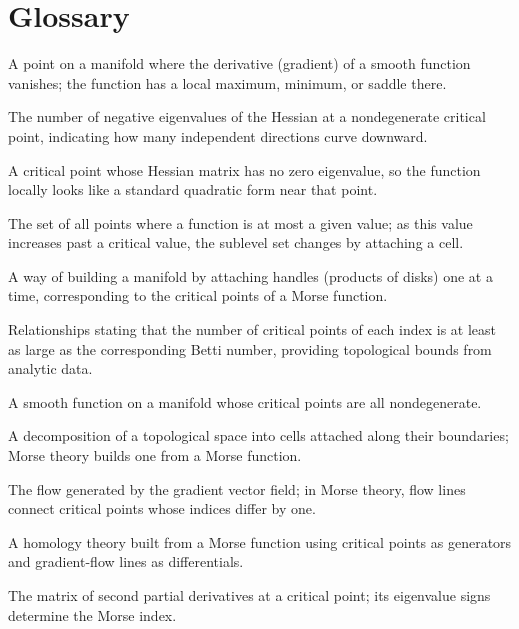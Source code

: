 \section*{Glossary}
\begin{description}[leftmargin=*,style=nextline,itemsep=0.3em]
\item[\textbf{Critical point.}] A point on a manifold where the derivative (gradient) of a smooth function vanishes; the function has a local maximum, minimum, or saddle there.
\item[\textbf{Morse index.}] The number of negative eigenvalues of the Hessian at a nondegenerate critical point, indicating how many independent directions curve downward.
\item[\textbf{Nondegenerate critical point.}] A critical point whose Hessian matrix has no zero eigenvalue, so the function locally looks like a standard quadratic form near that point.
\item[\textbf{Sublevel set.}] The set of all points where a function is at most a given value; as this value increases past a critical value, the sublevel set changes by attaching a cell.
\item[\textbf{Handle decomposition.}] A way of building a manifold by attaching handles (products of disks) one at a time, corresponding to the critical points of a Morse function.
\item[\textbf{Morse inequalities.}] Relationships stating that the number of critical points of each index is at least as large as the corresponding Betti number, providing topological bounds from analytic data.
\item[\textbf{Morse function.}] A smooth function on a manifold whose critical points are all nondegenerate.
\item[\textbf{CW structure.}] A decomposition of a topological space into cells attached along their boundaries; Morse theory builds one from a Morse function.
\item[\textbf{Gradient flow.}] The flow generated by the gradient vector field; in Morse theory, flow lines connect critical points whose indices differ by one.
\item[\textbf{Morse homology.}] A homology theory built from a Morse function using critical points as generators and gradient-flow lines as differentials.
\item[\textbf{Hessian.}] The matrix of second partial derivatives at a critical point; its eigenvalue signs determine the Morse index.
\end{description}

